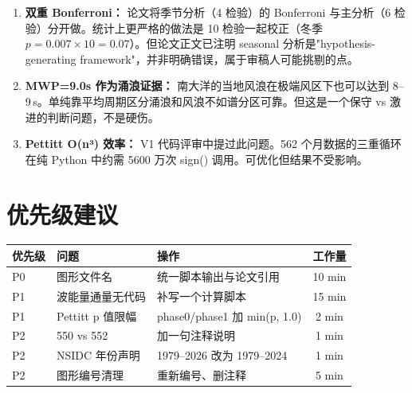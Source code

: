 \documentclass[11pt,a4paper]{article}
\begin{document}
\begin{enumerate}[leftmargin=*]
\item \textbf{双重 Bonferroni：} 论文将季节分析（4 检验）的 Bonferroni 与主分析（6 检验）分开做。统计上更严格的做法是 10 检验一起校正（冬季 $p=0.007\times10=0.07$）。但论文正文已注明 seasonal 分析是"hypothesis-generating framework"，并非明确错误，属于审稿人可能挑剔的点。

\item \textbf{MWP=9.0s 作为涌浪证据：} 南大洋的当地风浪在极端风区下也可以达到 8--9\,s。单纯靠平均周期区分涌浪和风浪不如谱分区可靠。但这是一个保守 vs 激进的判断问题，不是硬伤。

\item \textbf{Pettitt O(n³) 效率：} V1 代码评审中提过此问题。562 个月数据的三重循环在纯 Python 中约需 5600 万次 sign() 调用。可优化但结果不受影响。
\end{enumerate}

\section{优先级建议}

\begin{tabularx}{\textwidth}{lXXc}
\toprule
\textbf{优先级} & \textbf{问题} & \textbf{操作} & \textbf{工作量} \\
\midrule
P0 & 图形文件名 & 统一脚本输出与论文引用 & 10 min \\
P1 & 波能量通量无代码 & 补写一个计算脚本 & 15 min \\
P1 & Pettitt p 值限幅 & phase0/phase1 加 min(p, 1.0) & 2 min \\
P2 & 550 vs 552 & 加一句注释说明 & 1 min \\
P2 & NSIDC 年份声明 & 1979--2026 改为 1979--2024 & 1 min \\
P2 & 图形编号清理 & 重新编号、删注释 & 5 min \\
\bottomrule
\end{tabularx}

\vspace{0.8cm}
\begin{center}
\end{center}
\end{document}
